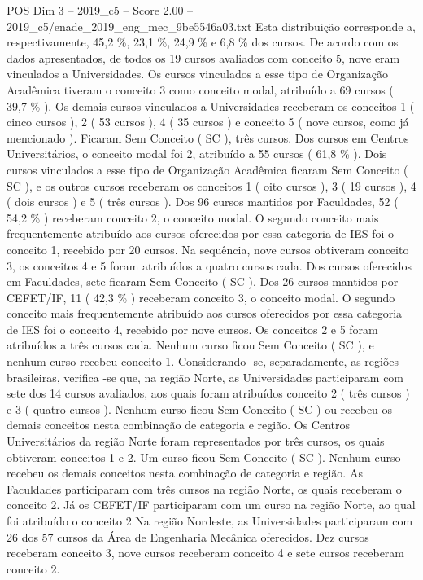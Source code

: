\begin{textsample}{POS Dim 3 – 2019\_c5 – Score 2.00 – 2019\_c5/enade\_2019\_eng\_mec\_9be5546a03.txt}
Esta distribuição corresponde a, respectivamente, 45,2 \%, 23,1 \%, 24,9 \% e 6,8 \% dos cursos.
De acordo com os dados apresentados, de todos os 19 cursos avaliados com conceito 5, nove eram vinculados a Universidades.
Os cursos vinculados a esse tipo de Organização Acadêmica tiveram o conceito 3 como conceito modal, atribuído a 69 cursos ( 39,7 \% ).
Os demais cursos vinculados a Universidades receberam os conceitos 1 ( cinco cursos ), 2 ( 53 cursos ), 4 ( 35 cursos ) e conceito 5 ( nove cursos, como já mencionado ).
Ficaram Sem Conceito ( SC ), três cursos.
Dos cursos em Centros Universitários, o conceito modal foi 2, atribuído a 55 cursos ( 61,8 \% ).
Dois cursos vinculados a esse tipo de Organização Acadêmica ficaram Sem Conceito ( SC ), e os outros cursos receberam os conceitos 1 ( oito cursos ), 3 ( 19 cursos ), 4 ( dois cursos ) e 5 ( três cursos ).
Dos 96 cursos mantidos por Faculdades, 52 ( 54,2 \% ) receberam conceito 2, o conceito modal.
O segundo conceito mais frequentemente atribuído aos cursos oferecidos por essa categoria de IES foi o conceito 1, recebido por 20 cursos.
Na sequência, nove cursos obtiveram conceito 3, os conceitos 4 e 5 foram atribuídos a quatro cursos cada.
Dos cursos oferecidos em Faculdades, sete ficaram Sem Conceito ( SC ).
Dos 26 cursos mantidos por CEFET/IF, 11 ( 42,3 \% ) receberam conceito 3, o conceito modal.
O segundo conceito mais frequentemente atribuído aos cursos oferecidos por essa categoria de IES foi o conceito 4, recebido por nove cursos.
Os conceitos 2 e 5 foram atribuídos a três cursos cada.
Nenhum curso ficou Sem Conceito ( SC ), e nenhum curso recebeu conceito 1.
Considerando -se, separadamente, as regiões brasileiras, verifica -se que, na região Norte, as Universidades participaram com sete dos 14 cursos avaliados, aos quais foram atribuídos conceito 2 ( três cursos ) e 3 ( quatro cursos ).
Nenhum curso ficou Sem Conceito ( SC ) ou recebeu os demais conceitos nesta combinação de categoria e região.
Os Centros Universitários da região Norte foram representados por três cursos, os quais obtiveram conceitos 1 e 2.
Um curso ficou Sem Conceito ( SC ).
Nenhum curso recebeu os demais conceitos nesta combinação de categoria e região.
As Faculdades participaram com três cursos na região Norte, os quais receberam o conceito 2.
Já os CEFET/IF participaram com um curso na região Norte, ao qual foi atribuído o conceito 2 Na região Nordeste, as Universidades participaram com 26 dos 57 cursos da Área de Engenharia Mecânica oferecidos.
Dez cursos receberam conceito 3, nove cursos receberam conceito 4 e sete cursos receberam conceito 2.

\end{textsample}
